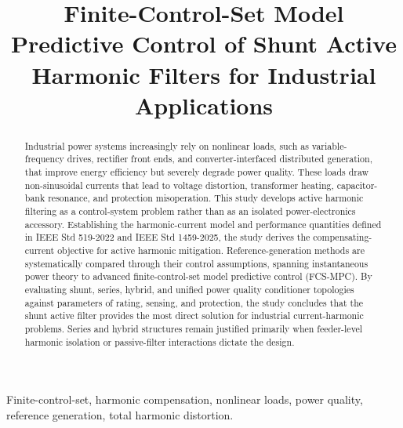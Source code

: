 \documentclass[conference]{IEEEtran}
\begin{document}
\title{Finite-Control-Set Model Predictive Control of Shunt Active Harmonic Filters for Industrial Applications}

\author{
}

\maketitle

\begin{abstract}
Industrial power systems increasingly rely on nonlinear loads, such as variable-frequency drives, rectifier front ends, and converter-interfaced distributed generation, that improve energy efficiency but severely degrade power quality. These loads draw non-sinusoidal currents that lead to voltage distortion, transformer heating, capacitor-bank resonance, and protection misoperation. This study develops active harmonic filtering as a control-system problem rather than as an isolated power-electronics accessory. Establishing the harmonic-current model and performance quantities defined in IEEE Std 519-2022 and IEEE Std 1459-2025, the study derives the compensating-current objective for active harmonic mitigation. Reference-generation methods are systematically compared through their control assumptions, spanning instantaneous power theory to advanced finite-control-set model predictive control (FCS-MPC). By evaluating shunt, series, hybrid, and unified power quality conditioner topologies against parameters of rating, sensing, and protection, the study concludes that the shunt active filter provides the most direct solution for industrial current-harmonic problems. Series and hybrid structures remain justified primarily when feeder-level harmonic isolation or passive-filter interactions dictate the design.
\end{abstract}

\begin{IEEEkeywords}
Finite-control-set, harmonic compensation, nonlinear loads, power quality, reference generation, total harmonic distortion.
\end{IEEEkeywords}
\end{document}
